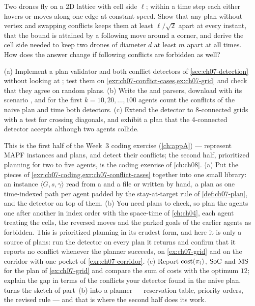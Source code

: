 \begin{exercise}[\difficulty{3}]
\label{exr:ch07-separation}
Two drones fly on a 2D lattice with cell side $\ell$; within a time step each
either hovers or moves along one edge at constant speed. Show that any plan
without vertex and swapping conflicts keeps them at least $\ell/\sqrt{2}$
apart at every instant, that the bound is attained by a following move around
a corner, and derive the cell side needed to keep two drones of diameter $d$
at least $m$ apart at all times. How does the answer change if following
conflicts are forbidden as well?
\end{exercise}

\begin{exercise}
\label{exr:ch07-coding}
(a) Implement a plan validator and both conflict detectors of
\cref{sec:ch07-detection} without looking at ; test them
on \cref{exr:ch07-conflict-cases,ex:ch07-grid} and check that they agree on
random plans. (b) Write the  and  parsers, download
 with its scenario , and for the first
$k = 10, 20, \dots, 100$ agents count the conflicts of the naive plan and
time both detectors. (c) Extend the detector to 8-connected grids with a test
for crossing diagonals, and exhibit a plan that the 4-connected detector
accepts although two agents collide.
\end{exercise}

\begin{exercise}
\label{exr:ch07-prioritized}
This is the first half of the Week~3 coding exercise (\cref{ch:appA}) --- represent
MAPF instances and plans, and detect their conflicts; the second half, prioritized
planning for two to five agents, is the coding exercise of \cref{ch:ch08}.
(a) Put the pieces of \cref{exr:ch07-coding,exr:ch07-conflict-cases} together into one
small library: an instance $\langle G, s, \gamma\rangle$ read from a  and a
 file or written by hand, a plan as one time-indexed path per agent padded
by the stay-at-target rule of \cref{def:ch07-plan}, and the detector on top of them.
(b) You need plans to check, so plan the agents one after another in index order with
the space-time \astar of \cref{ch:ch04}, each agent treating the cells, the reversed
moves and the parked goals of the earlier agents as forbidden. This is prioritized
planning in its crudest form, and here it is only a source of plans: run the detector
on every plan it returns and confirm that it reports no conflict whenever the planner
succeeds, on \cref{ex:ch07-grid} and on the corridor with one pocket of
\cref{exr:ch07-corridor}.
(c) Report $\operatorname{cost}(\pi_i)$, $\mathrm{SoC}$ and $\mathrm{MS}$ for the plan of
\cref{ex:ch07-grid} and compare the sum of costs with the optimum $12$; explain the
gap in terms of the conflicts your detector found in the naive plan.
 turns the sketch of part~(b) into a planner --- reservation table,
priority orders, the revised rule --- and that is where the second half does its work.
\end{exercise}

